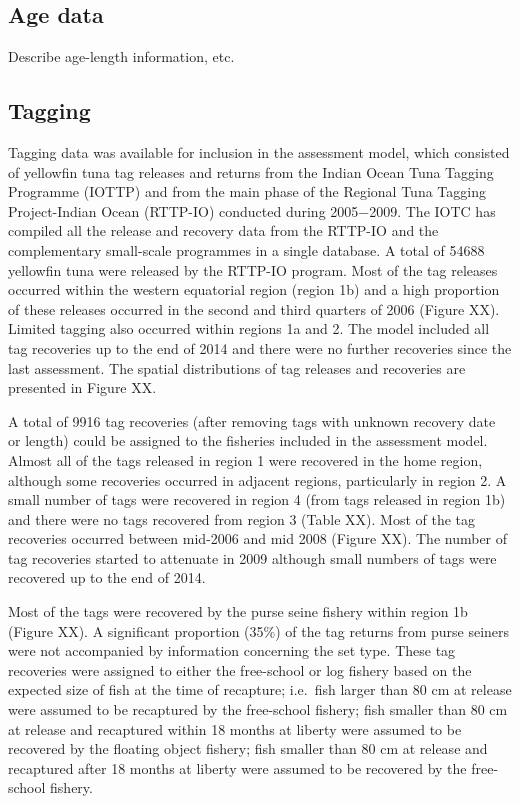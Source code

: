 \documentclass[
]{scrartcl}
\begin{document}
\subsection{Age data}\label{age-data}

Describe age-length information, etc.

\subsection{Tagging}\label{tagging}

Tagging data was available for inclusion in the assessment model, which
consisted of yellowfin tuna tag releases and returns from the Indian
Ocean Tuna Tagging Programme (IOTTP) and from the main phase of the
Regional Tuna Tagging Project-Indian Ocean (RTTP-IO) conducted during
2005−2009. The IOTC has compiled all the release and recovery data from
the RTTP-IO and the complementary small-scale programmes in a single
database. A total of 54688 yellowfin tuna were released by the RTTP-IO
program. Most of the tag releases occurred within the western equatorial
region (region 1b) and a high proportion of these releases occurred in
the second and third quarters of 2006 (Figure XX). Limited tagging also
occurred within regions 1a and 2. The model included all tag recoveries
up to the end of 2014 and there were no further recoveries since the
last assessment. The spatial distributions of tag releases and
recoveries are presented in Figure XX.

A total of 9916 tag recoveries (after removing tags with unknown
recovery date or length) could be assigned to the fisheries included in
the assessment model. Almost all of the tags released in region 1 were
recovered in the home region, although some recoveries occurred in
adjacent regions, particularly in region 2. A small number of tags were
recovered in region 4 (from tags released in region 1b) and there were
no tags recovered from region 3 (Table XX). Most of the tag recoveries
occurred between mid-2006 and mid 2008 (Figure XX). The number of tag
recoveries started to attenuate in 2009 although small numbers of tags
were recovered up to the end of 2014.

Most of the tags were recovered by the purse seine fishery within region
1b (Figure XX). A significant proportion (35\%) of the tag returns from
purse seiners were not accompanied by information concerning the set
type. These tag recoveries were assigned to either the free-school or
log fishery based on the expected size of fish at the time of recapture;
i.e.~fish larger than 80 cm at release were assumed to be recaptured by
the free-school fishery; fish smaller than 80 cm at release and
recaptured within 18 months at liberty were assumed to be recovered by
the floating object fishery; fish smaller than 80 cm at release and
recaptured after 18 months at liberty were assumed to be recovered by
the free-school fishery.
\end{document}

